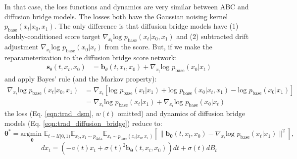 \documentclass{article}
\begin{document}
In that case, the loss functions and dynamics are very similar between ABC and diffusion bridge models. The losses both have the Gaussian noising kernel $p_\text{base}(x_t | x_0, x_1)$.
The only difference is that diffusion bridge models have (1) doubly-conditioned score target $\nabla_{x_t}\text{log } p_\text{base}(x_t | x_0, x_1)$ and (2) subtracted drift adjustment $\nabla_{x_t}\text{log }p_\text{base}(x_0 | x_t)$ from the score.
But, if we make the reparameterization to the diffusion bridge score network:
\begin{align}
    \mathbf{s}_\theta(t, x_t, x_0) &= \mathbf{b}_\theta(t, x_t, x_0) + \nabla_{x_t} \text{log }p_\text{base}(x_0 | x_t)
\end{align}
and apply Bayes' rule (and the Markov property):
\begin{align}
    \nabla_{x_t} \text{log }p_\text{base}(x_t | x_0, x_1) &= \nabla_{x_t} \left[\text{log }p_\text{base}(x_t | x_1) + \text{log }p_\text{base}(x_0 | x_t, x_1) - \text{log }p_\text{base}(x_0 | x_1)\right] \\
    &= \nabla_{x_t} \text{log }p_\text{base}(x_t | x_1) + \nabla_{x_t} \text{log }p_\text{base}(x_0 | x_t)
\end{align}
the loss (Eq. \ref{eqn:trad_dsm}, $w(t)$ omitted) and dynamics of diffusion bridge models (Eq. \ref{eqn:trad_diffusion_bridge}) reduce to:
\begin{equation}\label{eqn:simplified_loss_diffusion_bridge}
    \mathbf{\theta^*} = \underset{\mathbf{\theta}}{\text{argmin }}\mathbb{E}_{t \sim \mathcal{U}[0, 1)}\mathbb{E}_{x_0, x_1 \sim p_\text{data}}\mathbb{E}_{x_t \sim p_\text{base}(x_t | x_0, x_1)}[\|\mathbf{b_\theta}(t, x_t, x_0) - \nabla_{x_t}\text{log } p_\text{base}(x_t | x_1)\|^2],
\end{equation}
\begin{equation}\label{eqn:simplified_dynamics_diffusion_bridge}
    dx_t = \left(-a(t)x_t + \sigma(t)^2 \mathbf{b_\theta}(t, x_t, x_0)\right)dt + \sigma(t)dB_t
\end{equation}
\end{document}
